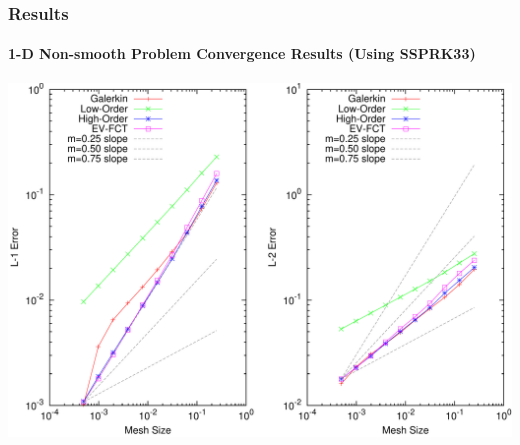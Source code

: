 \documentclass{beamer}
\begin{document}
\begin{frame}
\frametitle{Results}
\framesubtitle{1-D Non-smooth Problem Convergence Results (Using SSPRK33)}

\includegraphics[width=\textwidth]{./figures/convergence_absorber_SSPRK33.pdf}

\end{frame}
\end{document}
